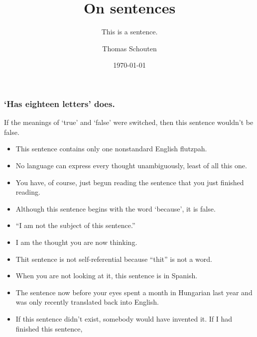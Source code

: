 \documentclass{beamer}
\title{On sentences}
\subtitle{This is a sentence.}
\author{Thomas Schouten}
\date{\today}
\begin{document}
    \frame{\titlepage}


    \begin{framefont}{\small}
        \begin{frame}
            \frametitle{`Has eighteen letters' does.}
            If the meanings of `true' and `false' were switched, then this sentence wouldn't be false.
            \begin{itemize}
                \item This sentence contains only one nonstandard English flutzpah.
                \item No language can express every thought unambiguously, least of all this one.
                \item You have, of course, just begun reading the sentence that you just finished reading.
                \item Although this sentence begins with the word `because', it is false.
                \item ``I am not the subject of this sentence.''
                \item I am the thought you are now thinking.
                \item Thit sentence is not self-referential because ``thit'' is not a word.
                \item When you are not looking at it, this sentence is in Spanish.
                \item The sentence now before your eyes spent a month in Hungarian last year and was only recently translated back into English.
                \item If this sentence didn't exist, somebody would have invented it.
                If I had finished this sentence,
            \end{itemize}
        \end{frame}
    \end{framefont}
\end{document}
